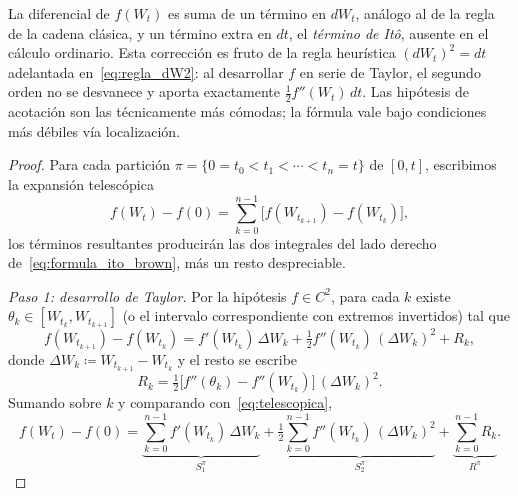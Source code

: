 \documentclass[11pt,a4paper,oneside]{report}
\theoremstyle{plain}
\theoremstyle{definition}
\theoremstyle{remark}
\newcommand{\1}{\mathbf{1}}
\newcommand{\eqdef}{\coloneqq}
\begin{document}
La diferencial de $f(W_t)$
es suma de un término en $dW_t$, análogo al de la regla de la cadena
clásica, y un término extra en $dt$, el \emph{término de Itô}, ausente en el cálculo ordinario. Esta corrección es fruto de la regla heurística $(dW_t)^2 = dt$ adelantada
en~\eqref{eq:regla_dW2}: al desarrollar $f$ en serie de Taylor, el
segundo orden no se desvanece y aporta exactamente $\tfrac{1}{2}
f''(W_t)\, dt$. Las hipótesis de acotación son las técnicamente más
cómodas; la fórmula vale bajo condiciones más débiles vía
localización.

\begin{proof}
Para cada partición $\pi = \{0 = t_0 < t_1 < \cdots < t_n = t\}$ de
$[0, t]$, escribimos la expansión telescópica
\begin{equation}\label{eq:telescopica}
  f(W_t) - f(0)
  = \sum_{k=0}^{n-1} \bigl[f(W_{t_{k+1}}) - f(W_{t_k})\bigr],
\end{equation}
los términos resultantes producirán las dos integrales del lado
derecho de~\eqref{eq:formula_ito_brown}, más un resto despreciable.

\emph{Paso 1: desarrollo de Taylor.} Por la hipótesis $f \in C^2$, para
cada $k$ existe $\theta_k \in [W_{t_k}, W_{t_{k+1}}]$ (o el intervalo
correspondiente con extremos invertidos) tal que
\begin{equation*}
  f(W_{t_{k+1}}) - f(W_{t_k})
  = f'(W_{t_k})\, \Delta W_k
   + \tfrac{1}{2} f''(W_{t_k})\, (\Delta W_k)^2
   + R_k,
\end{equation*}
donde $\Delta W_k \eqdef W_{t_{k+1}} - W_{t_k}$ y el resto se escribe
\begin{equation*}
  R_k = \tfrac{1}{2}\bigl[f''(\theta_k) - f''(W_{t_k})\bigr]\,
        (\Delta W_k)^2.
\end{equation*}
Sumando sobre $k$ y comparando con~\eqref{eq:telescopica},
\begin{equation}\label{eq:descomposicion_telescopica}
  f(W_t) - f(0)
  = \underbrace{\sum_{k=0}^{n-1} f'(W_{t_k})\, \Delta W_k}_{S_1^\pi}
   + \tfrac{1}{2} \underbrace{\sum_{k=0}^{n-1} f''(W_{t_k})\,
                              (\Delta W_k)^2}_{S_2^\pi}
   + \underbrace{\sum_{k=0}^{n-1} R_k}_{R^\pi}.
\end{equation}


\end{proof}
\end{document}
